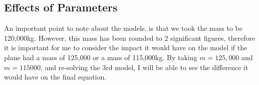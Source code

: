 \subsection{Effects of Parameters}
An important point to note about the models, is that we took the mass to be 120,000kg. However, this mass has been rounded to 2 significant figures, therefore it is important for me to consider the impact it would have on the model if the plane had a mass of 125,000 or a mass of 115,000kg. By taking $m=125,000$ and $m=115000$, and re-solving the 3rd model, I will be able to see the difference it would have on the final equation. 




